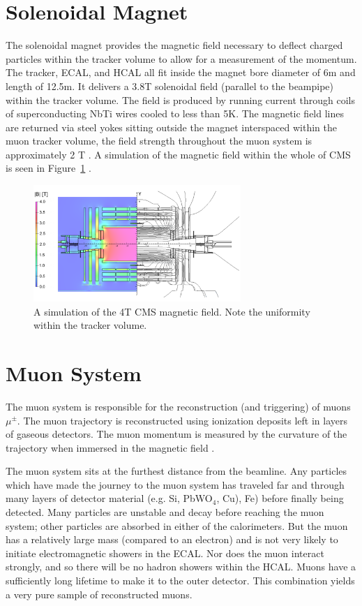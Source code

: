 \section{Solenoidal Magnet}

The solenoidal magnet provides the magnetic field necessary to deflect charged particles within the tracker volume to allow for a measurement of the momentum. The tracker, ECAL, and HCAL all fit inside the magnet bore diameter of 6m and length of 12.5m. It delivers a 3.8T solenoidal field (parallel to the beampipe) within the tracker volume. The field is produced by running current through coils of superconducting NbTi wires cooled to less than 5K. The magnetic field lines are returned via steel yokes sitting outside the magnet interspaced within the muon tracker volume, the field strength throughout the muon system is approximately 2 T \cite{magnettdr}. A simulation of the magnetic field within the whole of CMS is seen in Figure~\ref{fig:magnet} \cite{magnet}.

\begin{figure}
\centering
\includegraphics[width=0.7\textwidth]{figs/magnet.png}
\caption[A simulation of the 4T CMS magnetic field.]
{A simulation of the 4T CMS magnetic field. Note the uniformity within the tracker volume.}
\label{fig:magnet}
\end{figure}

\section{Muon System}

The muon system is responsible for the reconstruction (and triggering) of muons $\mu^{\pm}$. The muon trajectory is reconstructed using ionization deposits left in layers of gaseous detectors. The muon momentum is measured by the curvature of the trajectory when immersed in the magnetic field \cite{muontdr}.

The muon system sits at the furthest distance from the beamline. Any particles which have made the journey to the muon system has traveled far and through many layers of detector material (e.g. Si, PbWO$_{4}$, Cu), Fe) before finally being detected. Many particles are unstable and decay before reaching the muon system; other particles are absorbed in either of the calorimeters. But the muon has a relatively large mass (compared to an electron) and is not very likely to initiate electromagnetic showers in the ECAL. Nor does the muon interact strongly, and so there will be no hadron showers within the HCAL. Muons have a sufficiently long lifetime to make it to the outer detector. This combination yields a very pure sample of reconstructed muons.

